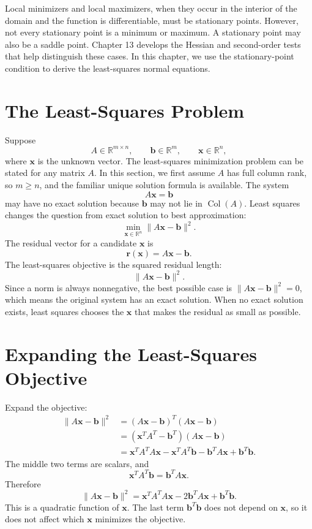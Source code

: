 Local minimizers and local maximizers, when they occur in the interior of the domain and the function is differentiable, must be stationary points. However, not every stationary point is a minimum or maximum. A stationary point may also be a saddle point. Chapter 13 develops the Hessian and second-order tests that help distinguish these cases. In this chapter, we use the stationary-point condition to derive the least-squares normal equations.

\section{The Least-Squares Problem}
\label{mf:least-squares-objective}

Suppose
\[
    A\in\mathbb{R}^{m\times n},
    \qquad
    \mathbf{b}\in\mathbb{R}^m,
    \qquad
    \mathbf{x}\in\mathbb{R}^n,
\]
where \(\mathbf{x}\) is the unknown vector. The least-squares minimization problem can be stated for any matrix \(A\). In this section, we first assume \(A\) has full column rank, so \(m\ge n\), and the familiar unique solution formula is available. The system
\[
    A\mathbf{x}=\mathbf{b}
\]
may have no exact solution because \(\mathbf{b}\) may not lie in \(\operatorname{Col}(A)\). Least squares changes the question from exact solution to best approximation:
\[
    \min_{\mathbf{x}\in\mathbb{R}^n}\|A\mathbf{x}-\mathbf{b}\|^2.
\]
The residual vector for a candidate \(\mathbf{x}\) is
\[
    \mathbf{r}(\mathbf{x})=A\mathbf{x}-\mathbf{b}.
\]
The least-squares objective is the squared residual length:
\[
    \|A\mathbf{x}-\mathbf{b}\|^2.
\]
Since a norm is always nonnegative, the best possible case is \(\|A\mathbf{x}-\mathbf{b}\|^2=0\), which means the original system has an exact solution. When no exact solution exists, least squares chooses the \(\mathbf{x}\) that makes the residual as small as possible.

\section{Expanding the Least-Squares Objective}
\label{mf:least-squares-expansion}

Expand the objective:
\[
\begin{aligned}
    \|A\mathbf{x}-\mathbf{b}\|^2
    &=(A\mathbf{x}-\mathbf{b})^T(A\mathbf{x}-\mathbf{b})\\
    &=(\mathbf{x}^T A^T-\mathbf{b}^T)(A\mathbf{x}-\mathbf{b})\\
    &=\mathbf{x}^T A^T A\mathbf{x}
      -\mathbf{x}^T A^T\mathbf{b}
      -\mathbf{b}^T A\mathbf{x}
      +\mathbf{b}^T\mathbf{b}.
\end{aligned}
\]
The middle two terms are scalars, and
\[
    \mathbf{x}^T A^T\mathbf{b}=\mathbf{b}^T A\mathbf{x}.
\]
Therefore
\[
    \|A\mathbf{x}-\mathbf{b}\|^2
    =\mathbf{x}^T A^T A\mathbf{x}
    -2\mathbf{b}^T A\mathbf{x}
    +\mathbf{b}^T\mathbf{b}.
\]
This is a quadratic function of \(\mathbf{x}\). The last term \(\mathbf{b}^T\mathbf{b}\) does not depend on \(\mathbf{x}\), so it does not affect which \(\mathbf{x}\) minimizes the objective.

